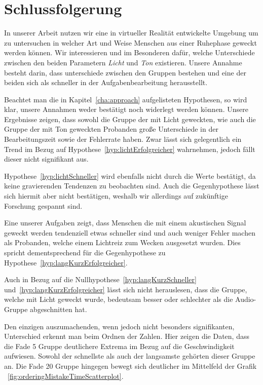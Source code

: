 \chapter{Schlussfolgerung}


In unserer Arbeit nutzen wir eine in virtueller Realität entwickelte Umgebung um zu untersuchen in welcher Art und Weise Menschen aus einer Ruhephase geweckt werden können.
Wir interessieren und im Besonderen dafür, welche Unterschiede zwischen den beiden Parametern \textit{Licht} und \textit{Ton} existieren.
Unsere Annahme besteht darin, dass unterschiede zwischen den Gruppen bestehen und eine der beiden sich als schneller in der Aufgabenbearbeitung herausstellt.

Beachtet man die in Kapitel~\ref{cha:approach} aufgelisteten Hypothesen, so wird klar, unsere Annahmen weder bestätigt noch widerlegt werden können. 
Unsere Ergebnisse zeigen, dass sowohl die Gruppe der mit Licht geweckten, wie auch die Gruppe der mit Ton geweckten Probanden große Unterschiede in der Bearbeitungszeit sowie der Fehlerrate haben.
Zwar lässt sich gelegentlich ein Trend im Bezug auf Hypothese~\ref{hyp:lichtErfolgreicher} wahrnehmen, jedoch fällt dieser nicht signifikant aus. 

Hypothese~\ref{hyp:lichtSchneller} wird ebenfalls nicht durch die Werte bestätigt, da keine gravierenden Tendenzen zu beobachten sind. Auch die Gegenhypothese lässt sich hiermit aber nicht bestätigen, weshalb wir allerdings auf zukünftige Forschung gespannt sind.

Eine unserer Aufgaben zeigt, dass Menschen die mit einem akustischen Signal geweckt werden tendenziell etwas schneller sind und auch weniger Fehler machen als Probanden, welche einem Lichtreiz zum Wecken ausgesetzt wurden.
Dies spricht dementsprechend für die Gegenhypothese zu Hypothese~\ref{hyp:langKurzErfolgreicher}.

Auch in Bezug auf die Nullhypothese~\ref{hyp:langKurzSchneller} und~\ref{hyp:langKurzErfolgreicher} lässt sich nicht herauslesen, dass die Gruppe, welche mit Licht geweckt wurde, bedeutsam besser oder schlechter als die Audio-Gruppe abgeschnitten hat.

Den einzigen auszumachenden, wenn jedoch nicht besonders signifikanten, Unterschied erkennt man beim Ordnen der Zahlen. 
Hier zeigen die Daten, dass die Fade 5 Gruppe deutlichere Extrema im Bezug auf die Geschwindigkeit aufwiesen. 
Sowohl der schnellste als auch der langsamste gehörten dieser Gruppe an. 
Die Fade 20 Gruppe hingegen bewegt sich deutlicher im Mittelfeld der Grafik ~\ref{fig:orderingMistakeTimeScatterplot}.

